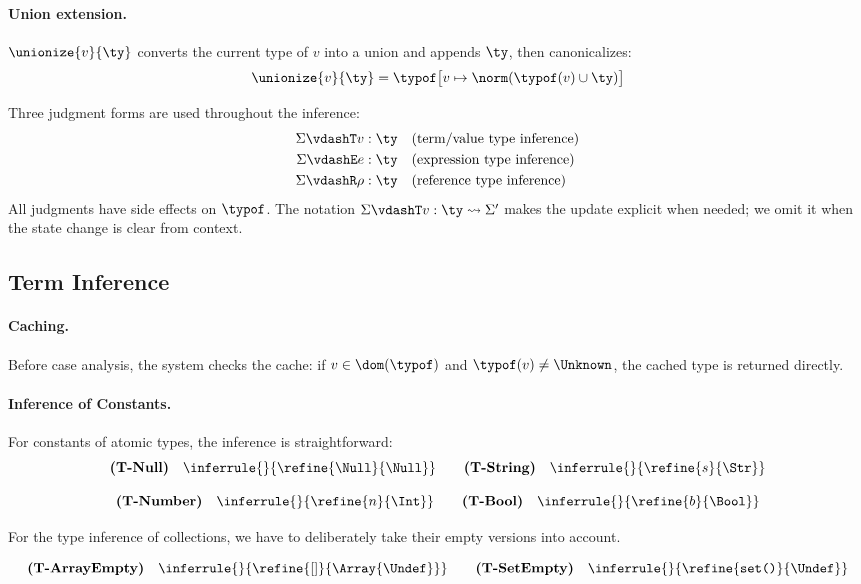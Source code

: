 \paragraph{Union extension.}
$\unionize{v}{\ty}$ converts the current type of $v$ into a union and appends $\ty$, then canonicalizes:
\[
\unionize{v}{\ty} = \typof\bigl[v \mapsto \norm(\typof(v) \cup \ty)\bigr]
\]

Three judgment forms are used throughout the inference:
\begin{align*}
\Sigma \vdashT v : \ty  &\quad\text{(term/value type inference)} \\
\Sigma \vdashE e : \ty  &\quad\text{(expression type inference)} \\
\Sigma \vdashR \rho : \ty &\quad\text{(reference type inference)}
\end{align*}
All judgments have side effects on $\typof$.
The notation $\Sigma \vdashT v : \ty \leadsto \Sigma'$ makes the update explicit when needed; we omit it when the state change is clear from context.

\subsection{Term Inference}
\label{sec:term-inference}

\paragraph{Caching.}
Before case analysis, the system checks the cache:
if $v \in \dom(\typof)$ and $\typof(v) \neq \Unknown$, the cached type is returned directly.


\paragraph{Inference of Constants.}
For constants of atomic types, the inference is straightforward:
\[
\textbf{(T-Null)}\quad
\inferrule{ }{\refine{\Null}{\Null}}
\qquad
\textbf{(T-String)}\quad
\inferrule{ }{\refine{s}{\Str}}
\]

\[
\textbf{(T-Number)}\quad
\inferrule{ }{\refine{n}{\Int}}
\qquad
\textbf{(T-Bool)}\quad
\inferrule{ }{\refine{b}{\Bool}}
\]

For the type inference of collections, we have to deliberately take their empty versions into account.

\[
\textbf{(T-ArrayEmpty)}\quad
\inferrule{ }{\refine{[]}{\Array{\Undef}}}
\qquad
\textbf{(T-SetEmpty)}\quad
\inferrule{ }{\refine{\texttt{set()}}{\Undef}}
\]

